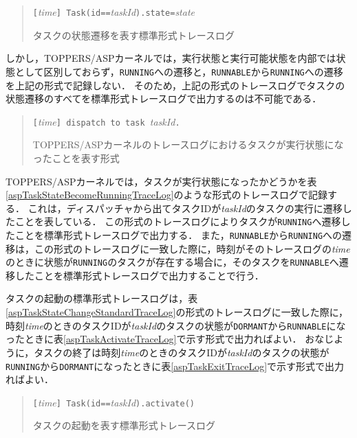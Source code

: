 \begin{table}[p]
\begin{quote}
\begin{breakbox}
{\tt [}{\it time}{\tt ] Task(id==}{\it taskId}{\tt ).state=}{\it state}
\end{breakbox}
\caption{タスクの状態遷移を表す標準形式トレースログ}
\label{aspTaskStateChangeStandardTraceLog}
\end{quote}
\end{table}

しかし，TOPPERS/ASPカーネルでは，実行状態と実行可能状態を内部では状態として区別しておらず，{\tt RUNNING}への遷移と，{\tt RUNNABLE}から{\tt RUNNING}への遷移を上記の形式で記録しない．
そのため，上記の形式のトレースログでタスクの状態遷移のすべてを標準形式トレースログで出力するのは不可能である．

\begin{table}[p]
\begin{quote}
\begin{breakbox}
{\tt [}{\it time}{\tt ] dispatch to task }{\it taskId}{\tt .}
\end{breakbox}
\caption{TOPPERS/ASPカーネルのトレースログにおけるタスクが実行状態になったことを表す形式}
\label{aspTaskStateBecomeRunningTraceLog}
\end{quote}
\end{table}

TOPPERS/ASPカーネルでは，タスクが実行状態になったかどうかを表\ref{aspTaskStateBecomeRunningTraceLog}のような形式のトレースログで記録する．
これは，ディスパッチャから出てタスクIDが{\it taskId}のタスクの実行に遷移したことを表している．
この形式のトレースログによりタスクが{\tt RUNNING}へ遷移したことを標準形式トレースログで出力する．
また，{\tt RUNNABLE}から{\tt RUNNING}への遷移は，この形式のトレースログに一致した際に，時刻がそのトレースログの{\it time}のときに状態が{\tt RUNNING}のタスクが存在する場合に，そのタスクを{\tt RUNNABLE}へ遷移したことを標準形式トレースログで出力することで行う．

タスクの起動の標準形式トレースログは，表\ref{aspTaskStateChangeStandardTraceLog}の形式のトレースログに一致した際に，時刻{\it time}のときのタスクIDが{\it taskId}のタスクの状態が{\tt DORMANT}から{\tt RUNNABLE}になったときに表\ref{aspTaskActivateTraceLog}で示す形式で出力ればよい．
おなじように，タスクの終了は時刻{\it time}のときのタスクIDが{\it taskId}のタスクの状態が{\tt RUNNING}から{\tt DORMANT}になったときに表\ref{aspTaskExitTraceLog}で示す形式で出力ればよい．

\begin{table}[p]
\begin{quote}
\begin{breakbox}
{\tt [}{\it time}{\tt ] Task(id==}{\it taskId}{\tt ).activate()}
\end{breakbox}
\caption{タスクの起動を表す標準形式トレースログ}
\label{aspTaskActivateTraceLog}
\end{quote}
\end{table}

